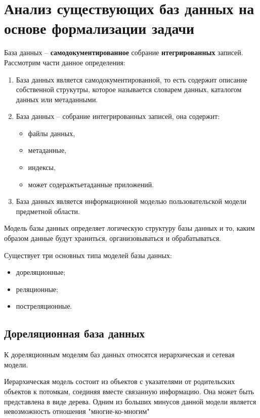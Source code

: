 \section{Анализ существующих баз данных на основе формализации задачи}
База данных -- \textbf{самодокументированное} собрание \textbf{нтегрированных} записей. Рассмотрим части данное определения:
\begin{enumerate}
    \item База данных является самодокументированной, то есть содержит описание собственной струкутры, которое называется 
    словарем данных, каталогом данных или метаданными.
    \item База данных -- собрание интегрированных записей, она содержит:
    \begin{itemize}
        \item файлы данных,
        \item метаданные,
        \item индексы,
        \item может содеражтьетаданные приложений.
    \end{itemize}
    \item База данных является информационной моделью пользовательской модели предметной области.
\end{enumerate}


Модель базы данных определяет логическую структуру базы данных и то, каким образом данные будут храниться, организовываться
и обрабатываться.

Существует три основных типа моделей базы данных:
\begin{itemize}
    \item дореляционные;
    \item реляционные;
    \item постреляционные.
\end{itemize}

\subsection{Дореляционная база данных}

К дореляционным моделям баз данных относятся иерархическая и сетевая модели.

Иерархическая модель состоит из объектов с указателями от родительских объектов к потомкам, 
соединяя вместе связанную информацию. Она может быть представлена в виде дерева. Одним из больших минусов данной
модели является невозможность отношения "многие-ко-многим"

